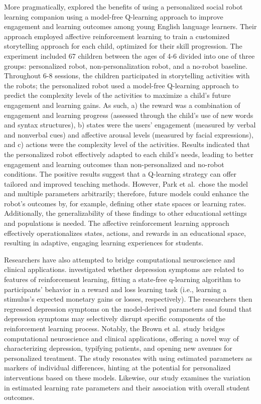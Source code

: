 \documentclass[
  number,
  preprint,
  3p,
  onecolumn]{elsarticle}
\begin{document}
More pragmatically, \citep{park2019} explored the benefits of using a
personalized social robot learning companion using a model-free
Q-learning approach to improve engagement and learning outcomes among
young English language learners. Their approach employed affective
reinforcement learning to train a customized storytelling approach for
each child, optimized for their skill progression. The experiment
included 67 children between the ages of 4-6 divided into one of three
groups: personalized robot, non-personalization robot, and a no-robot
baseline. Throughout 6-8 sessions, the children participated in
storytelling activities with the robots; the personalized robot used a
model-free Q-learning approach to predict the complexity levels of the
activities to maximize a child's future engagement and learning gains.
As such, a) the reward was a combination of engagement and learning
progress (assessed through the child's use of new words and syntax
structures), b) states were the users' engagement (measured by verbal
and nonverbal cues) and affective arousal levels (measured by facial
expressions), and c) actions were the complexity level of the
activities. Results indicated that the personalized robot effectively
adapted to each child's needs, leading to better engagement and learning
outcomes than non-personalized and no-robot conditions. The positive
results suggest that a Q-learning strategy can offer tailored and
improved teaching methods. However, Park et al.~chose the model and
multiple parameters arbitrarily; therefore, future models could enhance
the robot's outcomes by, for example, defining other state spaces or
learning rates. Additionally, the generalizability of these findings to
other educational settings and populations is needed. The affective
reinforcement learning approach effectively operationalizes states,
actions, and rewards in an educational space, resulting in adaptive,
engaging learning experiences for students.

Researchers have also attempted to bridge computational neuroscience and
clinical applications. \citep{brown2021} investigated whether depression
symptoms are related to features of reinforcement learning, fitting a
state-free q-learning algorithm to participants' behavior in a reward
and loss learning task (i.e., learning a stimulus's expected monetary
gains or losses, respectively). The researchers then regressed
depression symptoms on the model-derived parameters and found that
depression symptoms may selectively disrupt specific components of the
reinforcement learning process. Notably, the Brown et al.~study bridges
computational neuroscience and clinical applications, offering a novel
way of characterizing depression, typifying patients, and opening new
avenues for personalized treatment. The study resonates with using
estimated parameters as markers of individual differences, hinting at
the potential for personalized interventions based on these models.
Likewise, our study examines the variation in estimated learning rate
parameters and their association with overall student outcomes.
\end{document}
